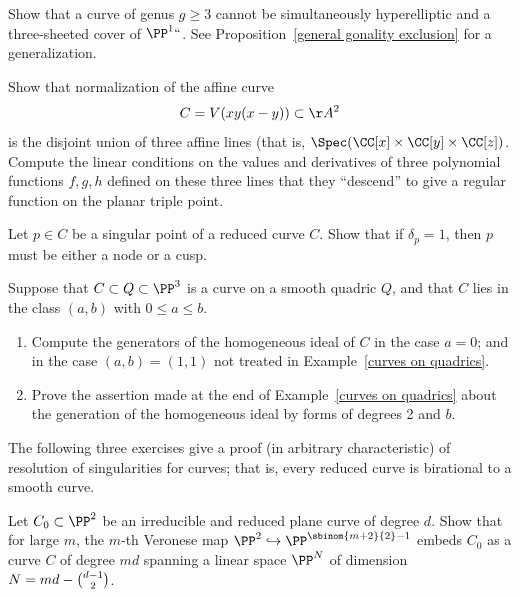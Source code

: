 \begin{exercise}\label{gonality exclusion}
%
%
Show that a curve of genus $g \geq 3$ cannot be simultaneously hyperelliptic and a three-sheeted cover of $\PP^1` `$.
See Proposition~\ref{general gonality exclusion} for a generalization.
\end{exercise}

\begin{exercise}\label{planar triple pt}
Show that normalization of the affine curve 
$$
C = V(xy(x-y)) \subset \AA^2
$$ 
is the disjoint union of three
affine lines (that is, $\Spec(\CC[x] \times \CC[y]\times \CC[z])$. Compute the linear conditions on the values and derivatives of three polynomial functions $f,g,h$ defined on
these three lines that they ``descend'' to give a regular function on
the planar 
triple point.
%
\end{exercise}

\begin{exercise}\label{delta=1 characterization}
Let $p \in C$ be a singular point of a reduced curve $C$. Show that if $\delta_p = 1$, then $p$ must be either a node or a cusp.
%
\end{exercise}

\begin{exercise}\label{curve on rank 4 quadric}
 Suppose that $C\subset Q\subset \PP^{3}$ is a curve on a smooth quadric $Q$, and that $C$ lies
 in the class $(a,b)$ with $0\leq a\leq b$.

\begin{enumerate}
 \item Compute the generators of the homogeneous ideal of $C$ in the case $a=0$; and in the case
 $(a,b) = (1,1)$ not treated in Example~\ref{curves on quadrics}.
 \item Prove the assertion  
made at the end of Example~\ref{curves on quadrics}
about the generation of the homogeneous ideal by forms of degrees 2 and $b$.
\end{enumerate}
\end{exercise}

The following three exercises give a proof (in arbitrary characteristic) of resolution of singularities for curves; that is, every reduced curve is birational to a smooth curve.
%

\begin{exercise}\label{Veronese of plane curve}
Let $C_0 \subset \PP^2$ be an irreducible and reduced plane curve of degree $d$. Show that for large $m$, the $m$-th Veronese map $\PP^2 \hookrightarrow \PP^{\sbinom{m+2}{2} - 1}$ embeds $C_0$ as a curve $C$ of degree $md$ spanning a linear space $\PP^N$ of dimension
$ N  =  md - \tbinom{d-1}{2}$. 
\end{exercise}

